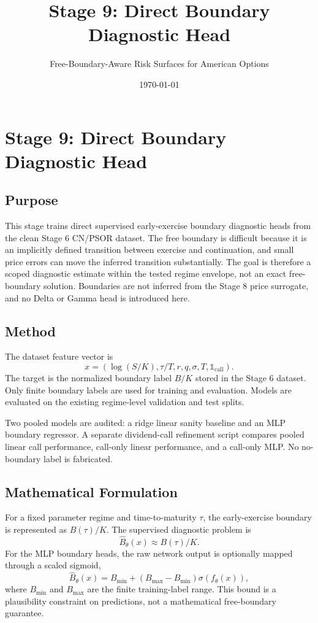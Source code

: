 \documentclass[11pt]{article}
\title{Stage 9: Direct Boundary Diagnostic Head}
\author{Free-Boundary-Aware Risk Surfaces for American Options}
\date{\today}
\begin{document}
\maketitle

\section{Stage 9: Direct Boundary Diagnostic Head}

\subsection{Purpose}
This stage trains direct supervised early-exercise boundary diagnostic heads
from the clean Stage 6 CN/PSOR dataset. The free boundary is difficult because
it is an implicitly defined transition between exercise and continuation, and
small price errors can move the inferred transition substantially. The goal is
therefore a scoped diagnostic estimate within the tested regime envelope, not
an exact free-boundary solution. Boundaries are not inferred from the Stage 8
price surrogate, and no Delta or Gamma head is introduced here.

\subsection{Method}
The dataset feature vector is
\[
x=(\log(S/K),\tau/T,r,q,\sigma,T,\mathbb{1}_{\mathrm{call}}).
\]
The target is the normalized boundary label $B/K$ stored in the Stage 6 dataset. Only finite boundary labels are used for training and evaluation. Models are evaluated on the existing regime-level validation and test splits.

Two pooled models are audited: a ridge linear sanity baseline and an MLP boundary regressor. A separate dividend-call refinement script compares pooled linear call performance, call-only linear performance, and a call-only MLP. No no-boundary label is fabricated.

\subsection{Mathematical Formulation}
For a fixed parameter regime and time-to-maturity $\tau$, the early-exercise boundary is represented as $B(\tau)/K$. The supervised diagnostic problem is
\[
\widehat{B}_{\theta}(x)\approx B(\tau)/K.
\]
For the MLP boundary heads, the raw network output is optionally mapped through a scaled sigmoid,
\[
\widehat{B}_{\theta}(x)=B_{\min}+(B_{\max}-B_{\min})\sigma(f_{\theta}(x)),
\]
where $B_{\min}$ and $B_{\max}$ are the finite training-label range. This bound is a plausibility constraint on predictions, not a mathematical free-boundary guarantee.
\end{document}
